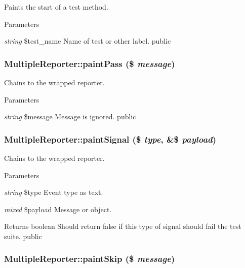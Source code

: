 \label{class_multiple_reporter_adf97d0d391f684bffccebc70d4b1c6be}
Paints the start of a test method. 
\begin{DoxyParams}{Parameters}
\item[{\em string}]\$test\_\-name Name of test or other label.  public \end{DoxyParams}
\hypertarget{class_multiple_reporter_af5d2815cc7b6ac663c73c059868b2345}{
\subsubsection[{paintPass}]{\setlength{\rightskip}{0pt plus 5cm}MultipleReporter::paintPass (\$ {\em message})}}
\label{class_multiple_reporter_af5d2815cc7b6ac663c73c059868b2345}
Chains to the wrapped reporter. 
\begin{DoxyParams}{Parameters}
\item[{\em string}]\$message Message is ignored.  public \end{DoxyParams}
\hypertarget{class_multiple_reporter_a42b8450ffd5c8af9756cd149f68fb287}{
\subsubsection[{paintSignal}]{\setlength{\rightskip}{0pt plus 5cm}MultipleReporter::paintSignal (\$ {\em type}, \/  \&\$ {\em payload})}}
\label{class_multiple_reporter_a42b8450ffd5c8af9756cd149f68fb287}
Chains to the wrapped reporter. 
\begin{DoxyParams}{Parameters}
\item[{\em string}]\$type Event type as text. \item[{\em mixed}]\$payload Message or object. \end{DoxyParams}
\begin{DoxyReturn}{Returns}
boolean Should return false if this type of signal should fail the test suite.  public 
\end{DoxyReturn}
\hypertarget{class_multiple_reporter_a624ac0566b6f0169675309446ee67693}{
\subsubsection[{paintSkip}]{\setlength{\rightskip}{0pt plus 5cm}MultipleReporter::paintSkip (\$ {\em message})}}
